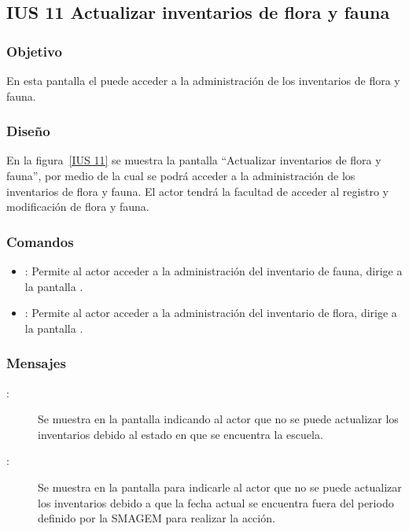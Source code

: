 \subsection{IUS 11 Actualizar inventarios de flora y fauna}

\subsubsection{Objetivo}
    
    En esta pantalla el  puede acceder a la administración de los inventarios de flora y fauna.

\subsubsection{Diseño}

    En la figura~\ref{IUS 11} se muestra la pantalla ``Actualizar inventarios de flora y fauna'', por medio de la cual se podrá acceder a la administración de los inventarios de flora y fauna. El actor tendrá la facultad de acceder al registro y modificación de flora y fauna.
    

\subsubsection{Comandos}
    \begin{itemize}
    \item {}: Permite al actor acceder a la administración del inventario de fauna, dirige a la pantalla .
    \item {}: Permite al actor acceder a la administración del inventario de flora, dirige a la pantalla .
    \end{itemize}

\subsubsection{Mensajes}

    \begin{description}
    \item[:] Se muestra en la pantalla  indicando al actor que no se puede actualizar los inventarios debido al estado en que se encuentra la escuela.
    
    \item [:] Se muestra en la pantalla  para indicarle al actor que no se puede actualizar los inventarios debido a que la fecha actual se encuentra fuera del periodo definido por la SMAGEM para realizar la acción.
\end{description}
